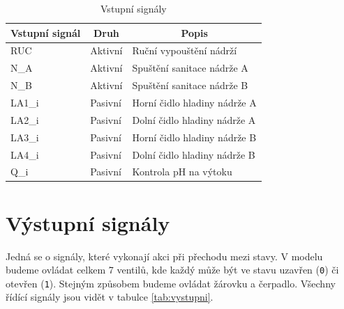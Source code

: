 \documentclass[12pt]{report}
\begin{document}
	\begin{table}[]
		\centering
		\begin{tabular}{lll}
			\hline
			\multicolumn{1}{c}{Vstupní signál} 	& \multicolumn{1}{c}{Druh} & \multicolumn{1}{c}{Popis}    \\ \hline
			RUC                                 & Aktivní                  & Ruční vypouštění nádrží      \\
			N\_A                                & Aktivní                  & Spuštění sanitace nádrže A   \\
			N\_B                                & Aktivní                  & Spuštění sanitace nádrže B   \\ \hline
			LA1\_i                              & Pasivní                  & Horní čidlo hladiny nádrže A \\
			LA2\_i                              & Pasivní                  & Dolní čidlo hladiny nádrže A \\
			LA3\_i                              & Pasivní                  & Horní čidlo hladiny nádrže B \\
			LA4\_i                              & Pasivní                  & Dolní čidlo hladiny nádrže B \\
			Q\_i                                & Pasivní                  & Kontrola pH na výtoku        \\ \hline
		\end{tabular}
		\caption{Vstupní signály}
		\label{tab:vstupni}
	\end{table}

	\section{Výstupní signály}
	Jedná se o signály, které vykonají akci při přechodu mezi stavy. V modelu budeme ovládat celkem 7 ventilů, kde každý může být ve stavu uzavřen (\texttt{0}) či otevřen (\texttt{1}). Stejným způsobem budeme ovládat žárovku a čerpadlo. Všechny řídící signály jsou vidět v tabulce \ref{tab:vystupni}.
	
\end{document}
